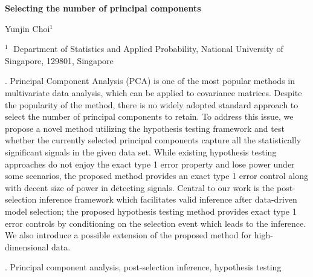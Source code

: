\documentclass[12pt]{article}
\begin{document}
\begin{flushleft}


{\LARGE\bf Selecting the number of principal components}


\vspace{1.0cm}

Yunjin Choi$^1$ 

\begin{description}

\item $^1 \;$ Department of Statistics and Applied Probability, National University of Singapore, 129801, Singapore


\end{description}

\end{flushleft}


\vspace{0.75cm}

. Principal Component Analysis (PCA) is one of the most popular methods in multivariate data analysis, which can be applied to covariance matrices. Despite the popularity of the method, there is no widely adopted standard approach to select the number of principal components to retain. To address this issue, we propose a novel method utilizing the hypothesis testing framework and test whether the currently selected principal components capture all the statistically significant signals in the given data set. While existing hypothesis testing approaches do not enjoy the exact type 1 error property and lose power under some scenarios, the proposed method provides an exact type 1 error control along with decent size of power in detecting signals. Central to our work is the post-selection inference framework which facilitates valid inference after data-driven model selection; the proposed hypothesis testing method provides exact type 1 error controls by conditioning on the selection event which leads to the inference. We also introduce a possible extension of the proposed method for high-dimensional data.

\vskip 2mm

.
Principal component analysis, post-selection inference, hypothesis testing
\end{document}
